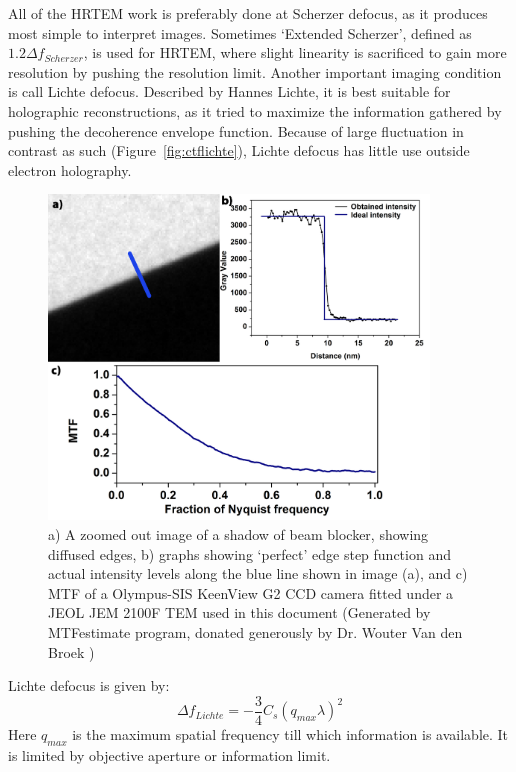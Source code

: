 All of the HRTEM work is preferably done at Scherzer defocus, as it produces most simple to interpret images.
Sometimes `Extended Scherzer', defined as $1.2 \Delta f_{Scherzer}$, is used for HRTEM, where slight linearity is sacrificed to gain more resolution by pushing the resolution limit.
Another important imaging condition is call Lichte defocus.
Described by Hannes Lichte, it is best suitable for holographic reconstructions, as it tried to maximize the information gathered by pushing the decoherence envelope function.\cite{Lichte1991}
Because of large fluctuation in contrast as such (Figure~\ref{fig:ctflichte}), Lichte defocus has little use outside electron holography.
\begin{figure}[t]
    \centering
    \includegraphics[width=0.9\textwidth]{figures/MTFtheory.pdf}
    \caption{a) A zoomed out image of a shadow of beam blocker, showing diffused edges, b) graphs showing `perfect' edge step function and actual intensity levels along the blue line shown in image (a), and c) MTF of a Olympus-SIS KeenView G2 CCD camera fitted under a JEOL JEM 2100F TEM used in this document (Generated by MTFestimate program, donated generously by Dr. Wouter Van den Broek \cite{VandenBroek2012})}
    \label{fig:mtfall}
\end{figure}

Lichte defocus is given by:
\begin{equation}
    \Delta f_{Lichte} = -\frac{3}{4} C_s (q_{max} \lambda)^2
\end{equation}
Here $q_{max}$ is the maximum spatial frequency till which information is available.
It is limited by objective aperture or information limit.

